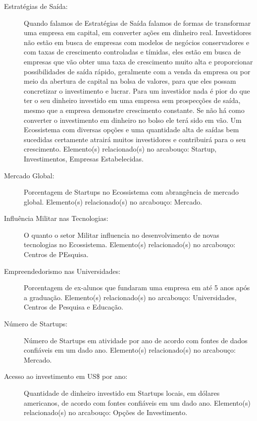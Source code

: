 \begin{description}

  \item [Estratégias de Saída:] Quando falamos de Estratégias de Saída falamos de formas de transformar uma empresa em capital, em converter ações em dinheiro real. Investidores não estão em busca de empresas com modelos de negócios conservadores e com taxas de crescimento controladas e tímidas, eles estão em busca de empresas que vão obter uma taxa de crescimento muito alta e proporcionar possibilidades de saída rápido, geralmente com a venda da empresa ou por meio da abertura de capital na bolsa de valores, para que eles possam concretizar o investimento e lucrar. Para um investidor nada é pior do que ter o seu dinheiro investido em uma empresa sem prospecções de saída, mesmo que a empresa demonstre crescimento constante. Se não há como converter o investimento em dinheiro no bolso ele terá sido em vão. Um Ecossistema com diversas opções e uma quantidade alta de saídas bem sucedidas certamente atrairá muitos investidores e contribuirá para o seu crescimento. Elemento(s) relacionado(s) no arcabouço: Startup, Investimentos, Empresas Estabelecidas.

  \item [Mercado Global:] Porcentagem de Startups no Ecossistema com abrangência de mercado global. Elemento(s) relacionado(s) no arcabouço: Mercado.

  \item [Influência Militar nas Tecnologias: ] O quanto o setor Militar influencia no desenvolvimento de novas tecnologias no Ecossistema. Elemento(s) relacionado(s) no arcabouço: Centros de PEsquisa.

  \item [Empreendedorismo nas Universidades:] Porcentagem de ex-alunos que fundaram uma empresa em até 5 anos após a graduação. Elemento(s) relacionado(s) no arcabouço: Universidades, Centros de Pesquisa e Educação.

  \item [Número de Startups:] Número de Startups em atividade por ano de acordo com fontes de dados confiáveis em um dado ano. Elemento(s) relacionado(s) no arcabouço: Mercado.

  \item [Acesso ao investimento em US\$ por ano:] Quantidade de dinheiro investido em Startups locais, em dólares americanos, de acordo com fontes confiáveis em um dado ano. Elemento(s) relacionado(s) no arcabouço: Opções de Investimento. 


\end{description}
